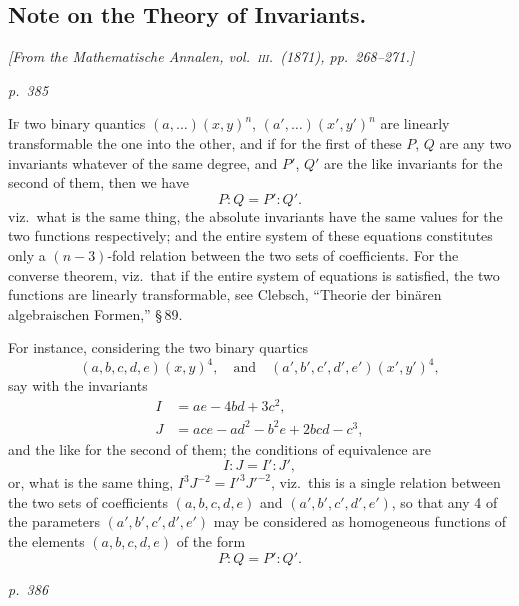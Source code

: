 \documentclass[11pt,a4paper]{book}
\begin{document}
\subsection{Note on the Theory of Invariants.}

\begin{center}
\textit{[From the Mathematische Annalen, vol.~\textsc{iii}.\ (1871), pp.~268--271.]}
\end{center}

\textit{p.~385}

\noindent
\textsc{If} two binary quantics $(a, \ldots)(x, y)^n$, $(a', \ldots)(x', y')^n$ are linearly transformable
the one into the other, and if for the first of these $P$, $Q$ are any two invariants whatever
of the same degree, and $P'$, $Q'$ are the like invariants for the second of them, then
we have
\[
P : Q = P' : Q'.
\]
viz.\ what is the same thing, the absolute invariants have the same values for the two
functions respectively; and the entire system of these equations constitutes only a
$(n-3)$-fold relation between the two sets of coefficients.  For the converse theorem,
viz.\ that if the entire system of equations is satisfied, the two functions are linearly
transformable, see Clebsch, ``Theorie der bin\"aren algebraischen Formen,'' \S\,89.

For instance, considering the two binary quartics
\[
(a, b, c, d, e)(x, y)^4, \quad \text{and} \quad (a', b', c', d', e')(x', y')^4,
\]
say with the invariants
\[
\begin{aligned}
I &= ae - 4bd + 3c^2, \\
J &= ace - ad^2 - b^2 e + 2bcd - c^3,
\end{aligned}
\]
and the like for the second of them; the conditions of equivalence are
\[
I : J = I' : J',
\]
or, what is the same thing, $I^3 J^{-2} = I'^3 J'^{-2}$, viz.\ this is a single relation between
the two sets of coefficients $(a, b, c, d, e)$ and $(a', b', c', d', e')$, so that any 4 of the
parameters $(a', b', c', d', e')$ may be considered as homogeneous functions of the
elements $(a, b, c, d, e)$ of the form
\[
P : Q = P' : Q'.
\]

\clearpage

\bigskip
\textit{p.~386}
\smallskip
\end{document}
